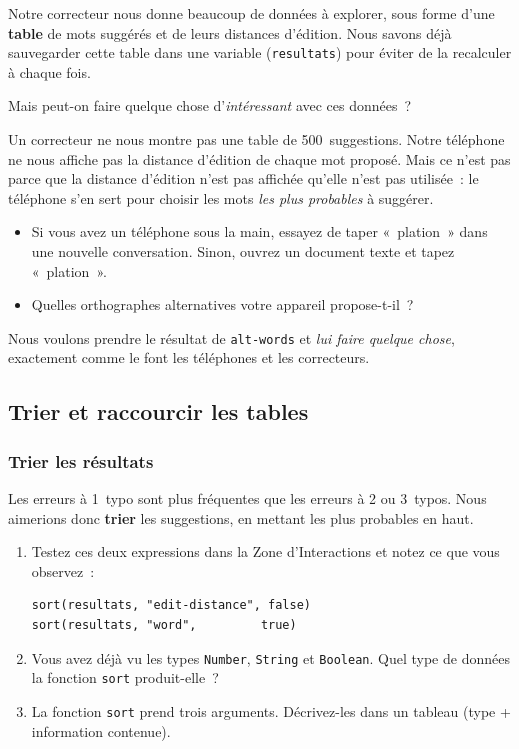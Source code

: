 \documentclass[12pt,a4paper]{article}
\begin{document}
Notre correcteur nous donne beaucoup de données à explorer, sous forme d'une \textbf{table} de mots suggérés et de leurs distances d'édition. Nous savons déjà sauvegarder cette table dans une variable (\texttt{resultats}) pour éviter de la recalculer à chaque fois.

Mais peut-on faire quelque chose d'\emph{intéressant} avec ces données~?

\begin{thinkbox}
  Un correcteur ne nous montre pas une table de 500~suggestions. Notre téléphone ne nous affiche pas la distance d'édition de chaque mot proposé. Mais ce n'est pas parce que la distance d'édition n'est pas affichée qu'elle n'est pas utilisée~: le téléphone s'en sert pour choisir les mots \emph{les plus probables} à suggérer.

  \begin{itemize}
    \item Si vous avez un téléphone sous la main, essayez de taper «~plation~» dans une nouvelle conversation. Sinon, ouvrez un document texte et tapez «~plation~».
    \item Quelles orthographes alternatives votre appareil propose-t-il~?
  \end{itemize}

  Nous voulons prendre le résultat de \texttt{alt-words} et \emph{lui faire quelque chose}, exactement comme le font les téléphones et les correcteurs.
\end{thinkbox}

\subsection{Trier et raccourcir les tables}

\subsubsection{Trier les résultats}

Les erreurs à 1~typo sont plus fréquentes que les erreurs à 2 ou 3~typos. Nous aimerions donc \textbf{trier} les suggestions, en mettant les plus probables en haut.

\begin{activitybox}
  \begin{enumerate}[leftmargin=*]
    \item Testez ces deux expressions dans la Zone d'Interactions et notez ce que vous observez~:
    \begin{lstlisting}
sort(resultats, "edit-distance", false)
sort(resultats, "word",         true)
    \end{lstlisting}
    \item Vous avez déjà vu les types \texttt{Number}, \texttt{String} et \texttt{Boolean}. Quel type de données la fonction \texttt{sort} produit-elle~?
    \item La fonction \texttt{sort} prend trois arguments. Décrivez-les dans un tableau (type + information contenue).
  \end{enumerate}
\end{activitybox}
\end{document}
